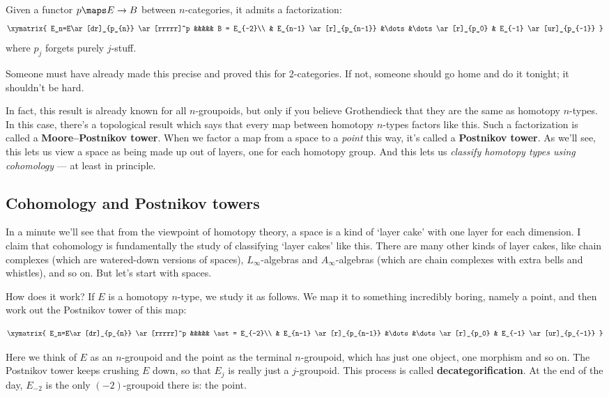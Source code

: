 \documentclass[12pt]{amsart}
\begin{document}
\begin{hyp}
  Given a functor $p\maps E\to B$ between $n$-categories, it admits a
  factorization:
\[\xymatrix{
  E_n=E\ar[dr]_{p_{n}} \ar[rrrrr]^p &&&&& B = E_{-2}\\
  & E_{n-1} \ar[r]_{p_{n-1}} &\dots&\dots \ar[r]_{p_0} & E_{-1} 
    \ar[ur]_{p_{-1}} }\]
where $p_j$ forgets purely $j$-stuff.
\end{hyp}

Someone must have already made this precise and proved this
for 2-categories.  If not, someone should
go home and do it tonight; it shouldn't be hard.

In fact, this result is already known for all $n$-groupoids, but only
if you believe Grothendieck that they are the same as homotopy
$n$-types.  In this case, there's a topological result which says that
every map between homotopy $n$-types factors like this.  Such a
factorization is called a \textbf{Moore--Postnikov tower}.  When we
factor a map from a space to a {\it point} this way, it's called a
\textbf{Postnikov tower}.  As we'll see, this lets us view a space as
being made up out of layers, one for each homotopy group.  And this
lets us \emph{classify homotopy types using cohomology} --- at least
in principle.

\subsection{Cohomology and Postnikov towers}
\label{sec:cohomology}

In a minute we'll see that from the viewpoint of homotopy theory,
a space is a kind of `layer cake' with one layer for each dimension.
I claim that cohomology is fundamentally the study of
classifying `layer cakes' like this.  There are many other kinds of
layer cakes, like chain complexes (which are watered-down versions of
spaces), $L_\infty$-algebras and $A_\infty$-algebras (which are chain
complexes with extra bells and whistles), and so on.  But let's start
with spaces.

How does it work?  If $E$ is a homotopy $n$-type, we study it as
follows.  We map it to something incredibly boring, namely a point, 
and then work out the Postnikov tower of this map:

\[\xymatrix{
  E_n=E\ar[dr]_{p_{n}} \ar[rrrrr]^p &&&&& \ast = E_{-2}\\
  & E_{n-1} \ar[r]_{p_{n-1}} &\dots&\dots \ar[r]_{p_0} & E_{-1} 
    \ar[ur]_{p_{-1}} }\]

\noindent
Here we think of $E$ as an $n$-groupoid and the point as the
terminal $n$-groupoid, which has just one object, one morphism
and so on.  The Postnikov tower keeps crushing $E$ down, so
that $E_j$ is really just a $j$-groupoid.  This process is called
{\bf decategorification}.  At the end of the day,
$E_{-2}$ is the only $(-2)$-groupoid there is: the point.
\end{document}
